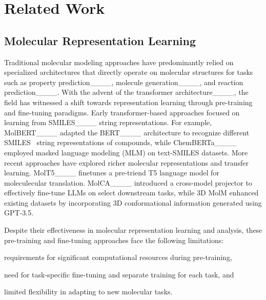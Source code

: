 \section{Related Work}
\subsection{Molecular Representation Learning}
Traditional molecular modeling approaches have predominantly relied on specialized architectures that directly operate on molecular structures for tasks such as property prediction____, molecule generation____, and reaction prediction____. With the advent of the transformer architecture____, the field has witnessed a shift towards representation learning through pre-training and fine-tuning paradigms. Early transformer-based approaches focused on learning from SMILES____ string representations. For example, MolBERT____ adapted the BERT____ architecture to recognize different SMILES~ string representations of compounds, while ChemBERTa____ employed masked language modeling (MLM) on text-SMILES datasets. More recent approaches have explored richer molecular representations and transfer learning. MolT5____ finetunes a pre-triend T5 language model for moleculecular translation. %
MolCA____ introduced a cross-model projector to effectively fine-tune LLMs on select downstream tasks, %
while 3D MolM enhanced existing datasets by incorporating 3D conformational information generated using GPT-3.5.

Despite their effectiveness in molecular representation learning and analysis, these pre-training and fine-tuning approaches face the following limitations:
\begin{inparaenum}[(a)]
    \item requirements for significant computational resources during pre-training,
    \item need for task-specific fine-tuning and separate training for each task, and
    \item limited flexibility in adapting to new molecular tasks.
\end{inparaenum}

